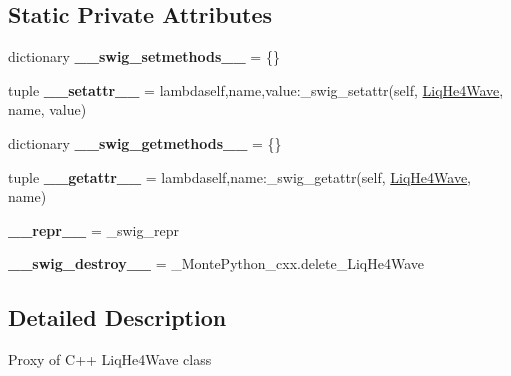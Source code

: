 \subsection*{Static Private Attributes}
\begin{DoxyCompactItemize}
\item 
\hypertarget{classMontePython__cxx_1_1LiqHe4Wave_a6da2f8692cf790b51aafb632d290c500}{}dictionary {\bfseries \+\_\+\+\_\+swig\+\_\+setmethods\+\_\+\+\_\+} = \{\}\label{classMontePython__cxx_1_1LiqHe4Wave_a6da2f8692cf790b51aafb632d290c500}

\item 
\hypertarget{classMontePython__cxx_1_1LiqHe4Wave_ac8493f76bf73f90143e3e6cc11b37dfa}{}tuple {\bfseries \+\_\+\+\_\+setattr\+\_\+\+\_\+} = lambdaself,name,value\+:\+\_\+swig\+\_\+setattr(self, \hyperlink{classMontePython__cxx_1_1LiqHe4Wave}{Liq\+He4\+Wave}, name, value)\label{classMontePython__cxx_1_1LiqHe4Wave_ac8493f76bf73f90143e3e6cc11b37dfa}

\item 
\hypertarget{classMontePython__cxx_1_1LiqHe4Wave_a3fd7cf3eda09f3687b48e7e6eca12edf}{}dictionary {\bfseries \+\_\+\+\_\+swig\+\_\+getmethods\+\_\+\+\_\+} = \{\}\label{classMontePython__cxx_1_1LiqHe4Wave_a3fd7cf3eda09f3687b48e7e6eca12edf}

\item 
\hypertarget{classMontePython__cxx_1_1LiqHe4Wave_a9dbda74c49a67a555ba83544ea83d4e1}{}tuple {\bfseries \+\_\+\+\_\+getattr\+\_\+\+\_\+} = lambdaself,name\+:\+\_\+swig\+\_\+getattr(self, \hyperlink{classMontePython__cxx_1_1LiqHe4Wave}{Liq\+He4\+Wave}, name)\label{classMontePython__cxx_1_1LiqHe4Wave_a9dbda74c49a67a555ba83544ea83d4e1}

\item 
\hypertarget{classMontePython__cxx_1_1LiqHe4Wave_aa83464e148a36eb95bd345e751c46677}{}{\bfseries \+\_\+\+\_\+repr\+\_\+\+\_\+} = \+\_\+swig\+\_\+repr\label{classMontePython__cxx_1_1LiqHe4Wave_aa83464e148a36eb95bd345e751c46677}

\item 
\hypertarget{classMontePython__cxx_1_1LiqHe4Wave_a7f6786a92722dbe26c9c35119939ef8b}{}{\bfseries \+\_\+\+\_\+swig\+\_\+destroy\+\_\+\+\_\+} = \+\_\+\+Monte\+Python\+\_\+cxx.\+delete\+\_\+\+Liq\+He4\+Wave\label{classMontePython__cxx_1_1LiqHe4Wave_a7f6786a92722dbe26c9c35119939ef8b}

\end{DoxyCompactItemize}


\subsection{Detailed Description}
\begin{DoxyVerb}Proxy of C++ LiqHe4Wave class\end{DoxyVerb}
 

